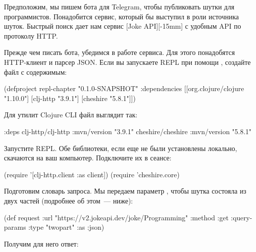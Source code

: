 \def\urljokeapi{https://jokeapi.dev/}

Предположим, мы пишем бота для Telegram, чтобы публиковать шутки для программистов. Понадобится сервис, который бы выступил в роли источника шуток. Быстрый поиск дает нам сервис \footurl{Joke API}{\urljokeapi}[Joke API][-15mm] с удобным API по протоколу HTTP.

Прежде чем писать бота, убедимся в работе сервиса. Для этого понадобятся HTTP-клиент и парсер JSON. Если вы запускаете REPL при помощи , создайте файл  с содержимым:

\begin{english}
  \begin{clojure}
(defproject repl-chapter "0.1.0-SNAPSHOT"
  :dependencies [[org.clojure/clojure "1.10.0"]
                 [clj-http "3.9.1"]
                 [cheshire "5.8.1"]])
  \end{clojure}
\end{english}

Для утилит Clojure CLI файл  выглядит так:

\begin{english}
  \begin{clojure}
{:deps
 {clj-http/clj-http {:mvn/version "3.9.1"}
  cheshire/cheshire {:mvn/version "5.8.1"}}}
  \end{clojure}
\end{english}

Запустите REPL. Обе библиотеки, если еще не были установлены локально, скачаются на ваш компьютер. Подключите их в сеансе:

\begin{english}
  \begin{clojure}
(require '[clj-http.client :as client])
(require 'cheshire.core)
  \end{clojure}
\end{english}

Подготовим словарь запроса. Мы передаем параметр , чтобы шутка состояла из двух частей (подробнее об этом~--- ниже):

\begin{english}
  \begin{clojure}
(def request
  {:url "https://v2.jokeapi.dev/joke/Programming"
   :method :get
   :query-params {:type "twopart"}
   :as :json})
  \end{clojure}
\end{english}

Получим для него ответ:

